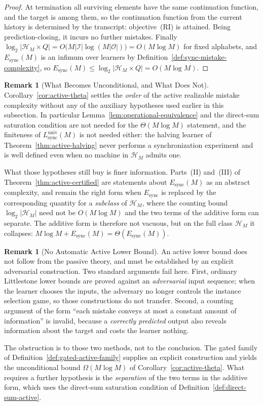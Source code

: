 \documentclass[12pt]{article}
\theoremstyle{definition}
\newtheorem{remark}[theorem]{Remark}
\newcommand{\Lsyncu}{L_{\mathrm{sync}}^{\mathrm{univ}}}
\newcommand{\Esync}{E_{\mathrm{sync}}}
\begin{document}
\begin{proof}
At termination all surviving elements have the same continuation function, and
the target is among them, so the continuation function from the current history
is determined by the transcript: objective~(RI) is attained.  Being
prediction-closing, it incurs no further mistakes.  Finally
$\log_2|\mathcal H_M\times Q|=O\bigl(M|\mathcal I|\log(M|\mathcal O|)\bigr)
=O(M\log M)$ for fixed alphabets, and $\Esync(M)$ is an infimum over learners
by Definition~\ref{def:sync-mistake-complexity}, so
$\Esync(M)\le\log_2|\mathcal H_M\times Q|=O(M\log M)$.
\end{proof}

\begin{remark}[What Becomes Unconditional, and What Does Not]
\label{rem:active-unconditional}
Corollary~\ref{cor:active-theta} settles the \emph{order} of the active
realizable mistake complexity without any of the auxiliary hypotheses used
earlier in this subsection.  In particular
Lemma~\ref{lem:operational-equivalence} and the direct-sum saturation
condition are not needed for the $\Theta(M\log M)$ statement, and the
finiteness of $\Lsyncu(M)$ is not needed either: the halving learner of
Theorem~\ref{thm:active-halving} never performs a synchronization experiment
and is well defined even when no machine in $\mathcal H_M$ admits one.

What those hypotheses still buy is finer information.  Parts~(II) and~(III) of
Theorem~\ref{thm:active-certified} are statements about $\Esync(M)$ as an
abstract complexity, and remain the right form when $\Esync$ is replaced by the
corresponding quantity for a \emph{subclass} of $\mathcal H_M$, where the
counting bound $\log_2|\mathcal H_M|$ need not be $O(M\log M)$ and the two
terms of the additive form can separate.  The additive form is therefore not
vacuous, but on the full class $\mathcal H_M$ it collapses:
$M\log M+\Esync(M)=\Theta(\Esync(M))$.
\end{remark}

\begin{remark}[No Automatic Active Lower Bound]
\label{rem:no-automatic-active-lower}
An active lower bound does not follow from the passive theory, and must be
established by an explicit adversarial construction.  Two standard arguments
fail here.  First, ordinary Littlestone lower bounds are proved against an
\emph{adversarial} input sequence; when the learner chooses the inputs, the
adversary no longer controls the instance selection game, so those
constructions do not transfer.  Second, a counting argument of the form ``each
mistake conveys at most a constant amount of information'' is invalid, because
a \emph{correctly predicted} output also reveals information about the target
and costs the learner nothing.

The obstruction is to those two methods, not to the conclusion.  The gated
family of Definition~\ref{def:gated-active-family} supplies an explicit
construction and yields the unconditional bound $\Omega(M\log M)$ of
Corollary~\ref{cor:active-theta}.  What requires a further hypothesis is the
\emph{separation} of the two terms in the additive form, which uses the
direct-sum saturation condition of Definition~\ref{def:direct-sum-active}.
\end{remark}
\end{document}

